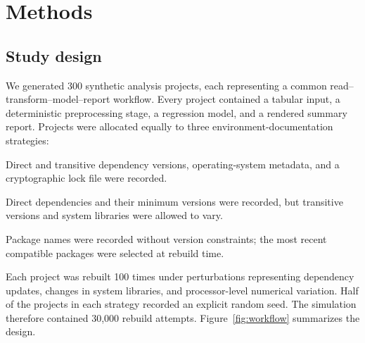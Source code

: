 \section{Methods}

\subsection{Study design}

We generated 300 synthetic analysis projects, each representing a common
read--transform--model--report workflow. Every project contained a tabular input,
a deterministic preprocessing stage, a regression model, and a rendered summary
report. Projects were allocated equally to three environment-documentation
strategies:

\begin{description}[style=nextline]
  \item[Fully pinned]
  Direct and transitive dependency versions, operating-system metadata, and a
  cryptographic lock file were recorded.

  \item[Partially specified]
  Direct dependencies and their minimum versions were recorded, but transitive
  versions and system libraries were allowed to vary.

  \item[Unpinned]
  Package names were recorded without version constraints; the most recent
  compatible packages were selected at rebuild time.
\end{description}

Each project was rebuilt 100 times under perturbations representing dependency
updates, changes in system libraries, and processor-level numerical variation.
Half of the projects in each strategy recorded an explicit random seed. The
simulation therefore contained 30,000 rebuild attempts. Figure~\ref{fig:workflow}
summarizes the design.

